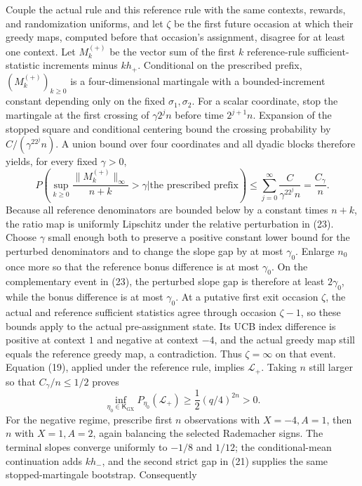 Couple the actual rule and this reference rule with the same contexts, rewards, and randomization uniforms, and let \(\zeta\) be the first future occasion at which their greedy maps, computed before that occasion's assignment, disagree for at least one context. Let \(M_k^{(+)}\) be the vector sum of the first \(k\) reference-rule sufficient-statistic increments minus \(kh_+\). Conditional on the prescribed prefix, \((M_k^{(+)})_{k\geq0}\) is a four-dimensional martingale with a bounded-increment constant depending only on the fixed \(\sigma_1,\sigma_2\). For a scalar coordinate, stop the martingale at the first crossing of \(\gamma 2^jn\) before time \(2^{j+1}n\). Expansion of the stopped square and conditional centering bound the crossing probability by \(C/(\gamma^22^jn)\). A union bound over four coordinates and all dyadic blocks therefore yields, for every fixed \(\gamma>0\),
\[
 P\left(\sup_{k\geq0}\frac{\|M_k^{(+)}\|_\infty}{n+k}>\gamma
 \mathrel{\Big|}\text{the prescribed prefix}\right)
 \leq \sum_{j=0}^{\infty}\frac{C}{\gamma^22^jn}
 =\frac{C_\gamma}{n}. \tag{23}
\]
Because all reference denominators are bounded below by a constant times \(n+k\), the ratio map is uniformly Lipschitz under the relative perturbation in (23). Choose \(\gamma\) small enough both to preserve a positive constant lower bound for the perturbed denominators and to change the slope gap by at most \(\gamma_0\). Enlarge \(n_0\) once more so that the reference bonus difference is at most \(\gamma_0\). On the complementary event in (23), the perturbed slope gap is therefore at least \(2\gamma_0\), while the bonus difference is at most \(\gamma_0\). At a putative first exit occasion \(\zeta\), the actual and reference sufficient statistics agree through occasion \(\zeta-1\), so these bounds apply to the actual pre-assignment state. Its UCB index difference is positive at context \(1\) and negative at context \(-4\), and the actual greedy map still equals the reference greedy map, a contradiction. Thus \(\zeta=\infty\) on that event. Equation (19), applied under the reference rule, implies \(\mathcal L_+\). Taking \(n\) still larger so that \(C_\gamma/n\leq1/2\) proves
\[
 \inf_{\eta_0\in\mathsf K_{\mathrm{GX}}}P_{\eta_0}(\mathcal L_+)
 \geq \frac12(q/4)^{2n}>0. \tag{24}
\]
For the negative regime, prescribe first \(n\) observations with \(X=-4,A=1\), then \(n\) with \(X=1,A=2\), again balancing the selected Rademacher signs. The terminal slopes converge uniformly to \(-1/8\) and \(1/12\); the conditional-mean continuation adds \(kh_-\), and the second strict gap in (21) supplies the same stopped-martingale bootstrap. Consequently
